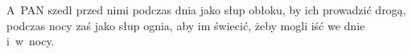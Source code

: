 \starthourpart[title={Zapalenie świecy Oazy\hfill {\tf Wj 13, 21}}]
A~PAN szedł przed nimi podczas dnia jako słup obłoku, by ich prowadzić drogą,
podczas nocy zaś jako słup ognia, aby im świecić, żeby mogli iść we dnie
i~w~nocy.\endinput
